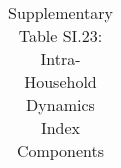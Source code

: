 \begin{longtable}{llcccccccccc}
\caption{Supplementary Table SI.23: Intra-Household Dynamics Index Components} \label{tab:pap__c2_3_a} \\                                                                                                                                                                                                                                                                                                                                                                                                                                                                                                                                                                                                                                                                                                                                                                                 
\hline \hline                                                                                                                                                                                                                                                                                                                                                                                                                                                                                                                                                                                                                                                                                                                                                                                                                                                                             

\end{longtable}
